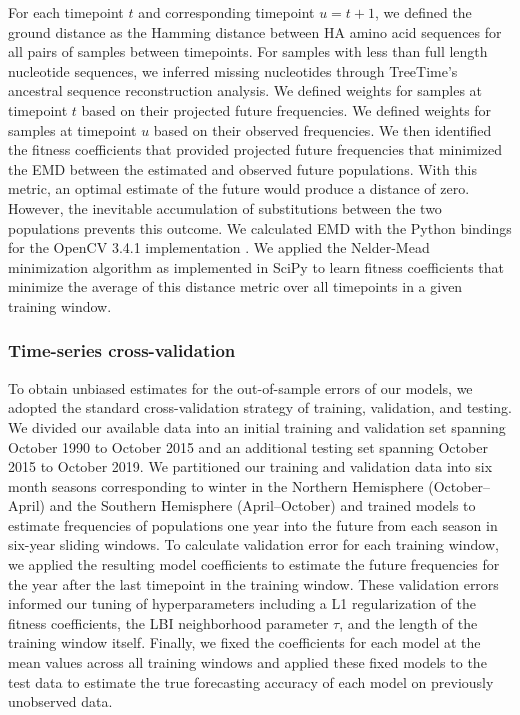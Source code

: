 For each timepoint $t$ and corresponding timepoint $u = t + 1$, we defined the ground distance as the Hamming distance between HA amino acid sequences for all pairs of samples between timepoints.
For samples with less than full length nucleotide sequences, we inferred missing nucleotides through TreeTime's ancestral sequence reconstruction analysis.
We defined weights for samples at timepoint $t$ based on their projected future frequencies.
We defined weights for samples at timepoint $u$ based on their observed frequencies.
We then identified the fitness coefficients that provided projected future frequencies that minimized the EMD between the estimated and observed future populations.
With this metric, an optimal estimate of the future would produce a distance of zero.
However, the inevitable accumulation of substitutions between the two populations prevents this outcome.
We calculated EMD with the Python bindings for the OpenCV 3.4.1 implementation \cite{opencv_library}.
We applied the Nelder-Mead minimization algorithm as implemented in SciPy \cite{SciPy} to learn fitness coefficients that minimize the average of this distance metric over all timepoints in a given training window.

\subsubsection*{Time-series cross-validation}

To obtain unbiased estimates for the out-of-sample errors of our models, we adopted the standard cross-validation strategy of training, validation, and testing.
We divided our available data into an initial training and validation set spanning October 1990 to October 2015 and an additional testing set spanning October 2015 to October 2019.
We partitioned our training and validation data into six month seasons corresponding to winter in the Northern Hemisphere (October--April) and the Southern Hemisphere (April--October) and trained models to estimate frequencies of populations one year into the future from each season in six-year sliding windows.
To calculate validation error for each training window, we applied the resulting model coefficients to estimate the future frequencies for the year after the last timepoint in the training window.
These validation errors informed our tuning of hyperparameters including a L1 regularization of the fitness coefficients, the LBI neighborhood parameter $\tau$, and the length of the training window itself.
Finally, we fixed the coefficients for each model at the mean values across all training windows and applied these fixed models to the test data to estimate the true forecasting accuracy of each model on previously unobserved data.

